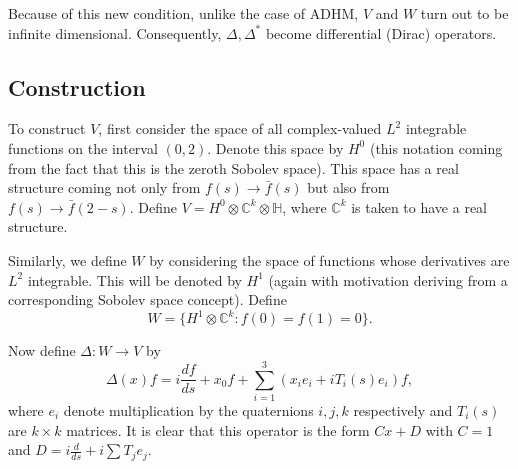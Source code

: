 	Because of this new condition, unlike the case of ADHM, $V$ and $W$ turn out to be infinite dimensional. Consequently, $\Delta, \Delta^*$ become differential (Dirac) operators.
	
	\subsection{Construction}

	To construct $V$, first consider the space of all complex-valued $L^2$ integrable functions on the interval $(0,2)$. Denote this space by $H^0$ (this notation coming from the fact that this is the zeroth Sobolev space). This space has a real structure coming not only from $f(s) \to \bar f(s)$ but also from $f(s) \to \bar f(2-s)$. Define $V = H^0 \otimes \mathbb C^k \otimes \mathbb H$, where $\mathbb C^k$ is taken to have a real structure. 

	Similarly, we define $W$ by considering the space of functions whose derivatives are $L^2$ integrable. This will be denoted by $H^1$ (again with motivation deriving from a corresponding Sobolev space concept). Define 
	$$W = \{H^1 \otimes \mathbb C^k : f(0) = f(1) = 0\}.$$


	Now define $\Delta: W \to V$ by
	\begin{equation}
		\Delta(x) f= i\frac{df}{ds} +x_0 f + \sum_{i=1}^3 (x_i e_i + i T_i(s) e_i) f,
	\end{equation}
	where $e_i$ denote multiplication by the quaternions $i,j,k$ respectively and $T_i(s)$ are $k \times k$ matrices. It is clear that this operator is the form $C x + D$ with $C = 1$ and $D = i \frac{d}{ds} + i \sum T_j e_j$.

